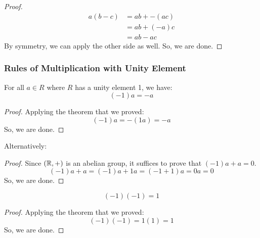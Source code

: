 \documentclass[letterpaper]{article}
\begin{document}
\begin{mdframed}[]
    \begin{proof}
        \begin{equation*}
            \begin{aligned}
                a(b - c) &= ab + -(ac) \\ 
                    &= ab + (-a)c \\ 
                    &= ab - ac
            \end{aligned}
        \end{equation*}
        By symmetry, we can apply the other side as well. So, we are done. 
    \end{proof}
\end{mdframed}

\subsubsection{Rules of Multiplication with Unity Element}
\begin{theorem}{}{}
    For all $a \in R$ where $R$ has a unity element 1, we have: 
    \[(-1)a = -a\]
\end{theorem}

\begin{mdframed}[]
    \begin{proof}
        Applying the theorem that we proved:
        \[(-1)a = -(1a) = -a\]
        So, we are done. 
    \end{proof}
\end{mdframed}

Alternatively:
\begin{mdframed}[]
    \begin{proof}
        Since $(\mathbb{R}, +)$ is an abelian group, it suffices to prove that $(-1)a + a = 0$.
        \[(-1)a + a = (-1)a + 1a = (-1 + 1)a = 0a = 0\]
        So, we are done. 
    \end{proof}
\end{mdframed}

\begin{theorem}{}{}
    \[(-1)(-1) = 1\]
\end{theorem}

\begin{mdframed}[]
    \begin{proof}
        Applying the theorem that we proved:
        \[(-1)(-1) = 1(1) = 1\]
        So, we are done.
    \end{proof}
\end{mdframed}
\end{document}
